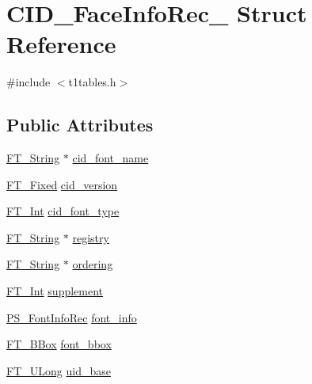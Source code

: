 \hypertarget{struct_c_i_d___face_info_rec__}{\section{C\-I\-D\-\_\-\-Face\-Info\-Rec\-\_\- Struct Reference}
\label{struct_c_i_d___face_info_rec__}
}


{\ttfamily \#include $<$t1tables.\-h$>$}

\subsection*{Public Attributes}
\begin{DoxyCompactItemize}
\item 
\hyperlink{fttypes_8h_a9846214585359eb2ba6bbb0e6de30639}{F\-T\-\_\-\-String} $\ast$ \hyperlink{struct_c_i_d___face_info_rec___a804ff6d8a672236f258bfe7baf20867a}{cid\-\_\-font\-\_\-name}
\item 
\hyperlink{fttypes_8h_a5f5a679cc09f758efdd0d1c5feed3c3d}{F\-T\-\_\-\-Fixed} \hyperlink{struct_c_i_d___face_info_rec___af37ddd46827a8e45fbcce60f43e2f61c}{cid\-\_\-version}
\item 
\hyperlink{fttypes_8h_af90e5fb0d07e21be9fe6faa33f02484c}{F\-T\-\_\-\-Int} \hyperlink{struct_c_i_d___face_info_rec___a83ce2384925f2fec44a823cf635abe8c}{cid\-\_\-font\-\_\-type}
\item 
\hyperlink{fttypes_8h_a9846214585359eb2ba6bbb0e6de30639}{F\-T\-\_\-\-String} $\ast$ \hyperlink{struct_c_i_d___face_info_rec___a7f553f371d2c960b4c46876f748f5c0d}{registry}
\item 
\hyperlink{fttypes_8h_a9846214585359eb2ba6bbb0e6de30639}{F\-T\-\_\-\-String} $\ast$ \hyperlink{struct_c_i_d___face_info_rec___acbc231cd616375331c2c1a7bb31b2f87}{ordering}
\item 
\hyperlink{fttypes_8h_af90e5fb0d07e21be9fe6faa33f02484c}{F\-T\-\_\-\-Int} \hyperlink{struct_c_i_d___face_info_rec___a6d35a867d12ca9cfa6ab06cf329d0354}{supplement}
\item 
\hyperlink{t1tables_8h_aea24b6bd1ce2570170c42cfd8718895e}{P\-S\-\_\-\-Font\-Info\-Rec} \hyperlink{struct_c_i_d___face_info_rec___ab7a975d269f3d2bd16554d2c3c1ba05f}{font\-\_\-info}
\item 
\hyperlink{ftimage_8h_ae341c4eb5a7199947a13b2a1dcaf7af7}{F\-T\-\_\-\-B\-Box} \hyperlink{struct_c_i_d___face_info_rec___a48fe4e9246535f547241028cbf8d8b41}{font\-\_\-bbox}
\item 
\hyperlink{fttypes_8h_a4fac88bdba78eb76b505efa6e4fbf3f5}{F\-T\-\_\-\-U\-Long} \hyperlink{struct_c_i_d___face_info_rec___a1fae2d9b863a9e27089894789ab4413e}{uid\-\_\-base}

\end{DoxyCompactItemize}
